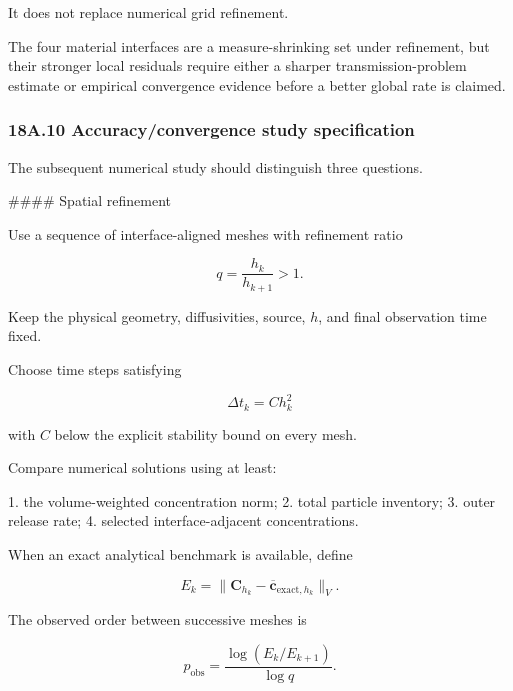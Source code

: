 \documentclass[11pt,a4paper]{article}
\begin{document}
It does not replace numerical grid refinement.

The four material interfaces are a measure-shrinking set under refinement, but their stronger local residuals require either a sharper transmission-problem estimate or empirical convergence evidence before a better global rate is claimed.

\subsubsection*{18A.10 Accuracy/convergence study specification}

The subsequent numerical study should distinguish three questions.

\#\#\#\# Spatial refinement

Use a sequence of interface-aligned meshes with refinement ratio

\begin{equation}
q=\frac{h_k}{h_{k+1}}>1.
\tag{TRISO-ACC-311}
\label{eq:triso-acc-311}
\end{equation}

Keep the physical geometry, diffusivities, source, $h$, and final observation time fixed.

Choose time steps satisfying

\begin{equation}
\Delta t_k
=
C h_k^2
\tag{TRISO-ACC-312}
\label{eq:triso-acc-312}
\end{equation}

with $C$ below the explicit stability bound on every mesh.

Compare numerical solutions using at least:

1. the volume-weighted concentration norm;
2. total particle inventory;
3. outer release rate;
4. selected interface-adjacent concentrations.

When an exact analytical benchmark is available, define

\begin{equation}
E_k
=
\|\mathbf C_{h_k}-\overline{\mathbf c}_{\mathrm{exact},h_k}\|_V.
\tag{TRISO-ACC-313}
\label{eq:triso-acc-313}
\end{equation}

The observed order between successive meshes is

\begin{equation}
\boxed{
p_{\mathrm{obs}}
=
\frac{
\log(E_k/E_{k+1})
}{
\log q
}.
}
\tag{TRISO-ACC-314}
\label{eq:triso-acc-314}
\end{equation}
\end{document}
